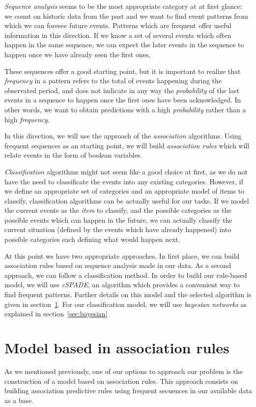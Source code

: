 \documentclass[a4paper,12pt]{article}
\begin{document}
\emph{Sequence analysis} seems to be the most appropriate category at at first glance: we count on historic data from the past and we want to find event patterns from which we can foresee future events. Patterns which are frequent offer useful information in this direction. If we know a set of several events which often happen in the same sequence, we can expect the later events in the sequence to happen once we have already seen the first ones.

These sequences offer a good starting point, but it is important to realize that \emph{frequency} in a pattern refers to the total of events happening during the observated period, and does not indicate in any way the \emph{probability} of the last events in a sequence to happen once the first ones have been acknowledged. In other words, we want to obtain predictions with a high \emph{probability} rather than a high \emph{frequency}.

In this direction, we will use the approach of the \emph{association} algorithms. Using frequent sequences as an starting point, we will build \emph{association rules} which will relate events in the form of boolean variables.

\emph{Classification} algorithms might not seem like a good choice at first, as we do not have the need to classificate the events into any existing categories. However, if we define an appropriate set of categories and an appropriate model of items to classify, classification algorithms can be actually useful for our tasks. If we model the current events as the \emph{item} to classify, and the possible categories as the possible events which can happen in the future, we can actually classify the current situation (defined by the events which have already happened) into possible categories each defining what would happen next.

At this point we have two appropriate approaches. In first place, we can build association rules based on sequence analysis made in our data. As a second approach, we can follow a classification method. In order to build our rule-based model, we will use \emph{cSPADE}, an algorithm which provides a convenient way to find frequent patterns. Further details on this model and the selected algorithm is given in section~\ref{sec:rule_model}. For our classification model, we will use \emph{bayesian networks} as explained in section~\ref{sec:bayesian}

\section{Model based in association rules}\label{sec:rule_model}
As we mentioned previously, one of our options to approach our problem is the construction of a model based on association rules. This approach consists on building association predictive rules using frequent secuences in our available data as a base.
\end{document}
